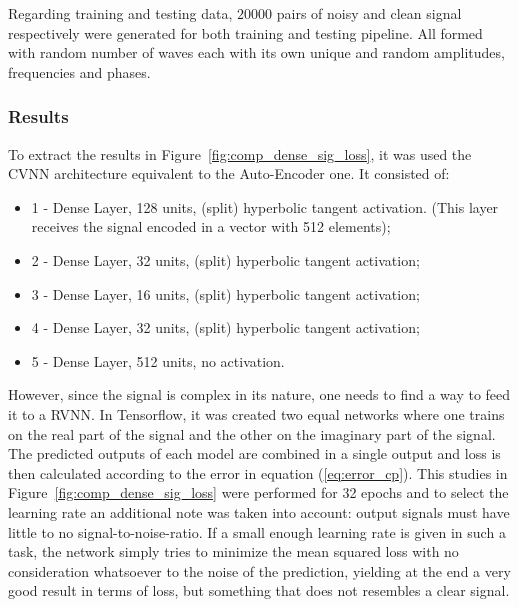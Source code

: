 Regarding training and testing data, $ 20000 $ pairs of noisy and clean signal respectively were generated for both training and testing pipeline. All formed with random number of waves each with its own unique and random amplitudes, frequencies and phases.

\subsubsection{Results}
To extract the results in Figure~\ref{fig:comp_dense_sig_loss}, it was used the \gls{CVNN} architecture equivalent to the Auto-Encoder one. It consisted of:

\begin{itemize}
	\item 1 - Dense Layer, 128 units, (split) hyperbolic tangent activation. (This layer receives the signal encoded in a vector with 512 elements);
	\item 2 - Dense Layer, 32 units, (split) hyperbolic tangent activation;
	\item 3 - Dense Layer, 16 units, (split) hyperbolic tangent activation;
	\item 4 - Dense Layer, 32 units, (split) hyperbolic tangent activation;
	\item 5 - Dense Layer, 512 units, no activation.
\end{itemize}

However, since the signal is complex in its nature, one needs to find a way to feed it to a \gls{RVNN}. In Tensorflow, it was created two equal networks where one trains on the real part of the signal and the other on the imaginary part of the signal. The predicted outputs of each model are combined in a single output and loss is then calculated according to the error in equation (\ref{eq:error_cp}). This studies in Figure~\ref{fig:comp_dense_sig_loss} were performed for 32 epochs and to select the learning rate an additional note was taken into account: output signals must have little to no signal-to-noise-ratio. If a small enough learning rate is given in such a task, the network simply tries to minimize the mean squared loss with no consideration whatsoever to the noise of the prediction, yielding at the end a very good result in terms of loss, but something that does not resembles a clear signal. 

